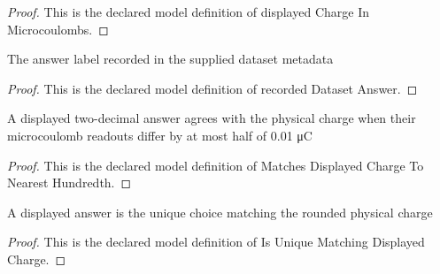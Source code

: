 \begin{proof}
  This is the declared model definition of displayed Charge In Microcoulombs.
\end{proof}
\begin{definition}
  \label{def:physics:phyx-mini-0904:phyxminiproblems-problemphyxmini0904-recordeddatasetanswer}
  The answer label recorded in the supplied dataset metadata
\end{definition}
\begin{proof}
  This is the declared model definition of recorded Dataset Answer.
\end{proof}
\begin{definition}
  \label{def:physics:phyx-mini-0904:phyxminiproblems-problemphyxmini0904-matchesdisplayedchargetonearesthundredth}
  A displayed two-decimal answer agrees with the physical charge when their microcoulomb readouts differ by at most half of 0.01 μC
\end{definition}
\begin{proof}
  This is the declared model definition of Matches Displayed Charge To Nearest Hundredth.
\end{proof}
\begin{definition}
  \label{def:physics:phyx-mini-0904:phyxminiproblems-problemphyxmini0904-isuniquematchingdisplayedcharge}
  A displayed answer is the unique choice matching the rounded physical charge
\end{definition}
\begin{proof}
  This is the declared model definition of Is Unique Matching Displayed Charge.
\end{proof}
